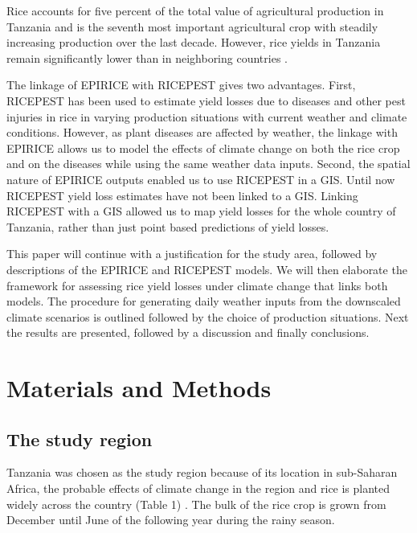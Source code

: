 \documentclass[preprint,review,12pt]{elsarticle}
\begin{document}
    Rice accounts for five percent of the total value of agricultural production in Tanzania and is the seventh most important agricultural crop with steadily increasing production over the last decade. However, rice yields in Tanzania remain significantly lower than in neighboring countries \cite{Barreiro-Hurle2012}.
    
    The linkage of EPIRICE with RICEPEST gives two advantages. First, RICEPEST has been used to estimate yield losses due to diseases and other pest injuries in rice in varying production situations with current weather and climate conditions. However, as plant diseases are affected by weather, the linkage with EPIRICE allows us to model the effects of climate change on both the rice crop and on the diseases while using the same weather data inputs. Second, the spatial nature of EPIRICE outputs enabled us to use RICEPEST in a GIS. Until now RICEPEST yield loss estimates have not been linked to a GIS. Linking RICEPEST with a GIS allowed us to map yield losses for the whole country of Tanzania, rather than just point based predictions of yield losses.
    
    This paper will continue with a justification for the study area, followed by descriptions of the EPIRICE and RICEPEST models. We will then elaborate the framework for assessing rice yield losses under climate change that links both models. The procedure for generating daily weather inputs from the downscaled climate scenarios is outlined followed by the choice of production situations. Next the results are presented, followed by a discussion and finally conclusions.
    
    \section{Materials and Methods}
    
    
    \subsection{The study region}
    Tanzania was chosen as the study region because of its location in sub-Saharan Africa, the probable effects of climate change in the region and rice is planted widely across the country  (Table 1) \cite{Rowhani2011}. The bulk of the rice crop is grown from December until June of the following year during the rainy season. 
    
\end{document}
